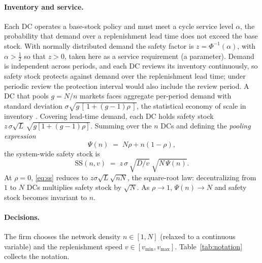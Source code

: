 \documentclass[11pt]{article}
\numberwithin{proposition}{section}
\theoremstyle{definition}
\theoremstyle{remark}
\theoremstyle{plain}
\newcommand{\sstock}{\mathrm{SS}}
\begin{document}
\paragraph{Inventory and service.} Each DC operates a base-stock policy and must meet a cycle service level
$\alpha$, the probability that demand over a replenishment lead time does not exceed the base stock. With normally distributed demand the safety factor is $z = \Phi^{-1}(\alpha)$, with $\alpha>\tfrac12$ so
that $z>0$, taken here as a service requirement (a parameter). Demand is independent across periods, and each DC reviews its
inventory continuously, so safety stock protects against demand over the replenishment lead time; under periodic
review the protection interval would also include the review period. A DC that pools $g = N/n$ markets faces aggregate per-period demand with
standard deviation $\sigma\sqrt{g\,[\,1+(g-1)\rho\,]}$, the statistical economy of scale in inventory
\citep{eppen1979effects}. Covering lead-time demand, each DC holds safety stock
$z\,\sigma\sqrt{L}\,\sqrt{g[1+(g-1)\rho]}$. Summing over the $n$ DCs and defining the \emph{pooling expression}
\begin{equation}\label{eq:psi}
  \Psi(n) \;=\; N\rho + n(1-\rho),
\end{equation}
the system-wide safety stock is
\begin{equation}\label{eq:ss}
  \sstock(n,v) \;=\; z\,\sigma\,\sqrt{D/v}\;\sqrt{N\,\Psi(n)} .
\end{equation}
At $\rho = 0$, \eqref{eq:ss} reduces to $z\sigma\sqrt{L}\sqrt{nN}$, the square-root law: decentralizing
from $1$ to $N$ DCs multiplies safety stock by $\sqrt{N}$. As $\rho \to 1$, $\Psi(n) \to N$ and safety stock
becomes invariant to $n$.

\paragraph{Decisions.} The firm chooses the network density $n \in [1,N]$ (relaxed to a continuous
variable) and the replenishment speed $v \in [v_{\min}, v_{\max}]$. Table~\ref{tab:notation} collects the notation.
\end{document}
